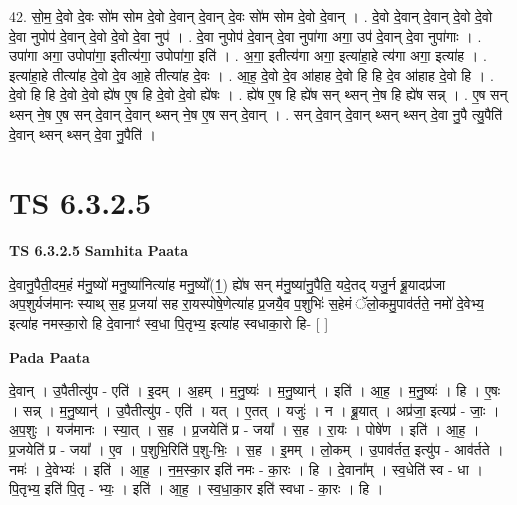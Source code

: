 \documentclass[17pt]{extarticle}
\begin{document}
42. सो॒म॒ दे॒वो दे॒वः सो॑म सोम दे॒वो दे॒वान् दे॒वान् दे॒वः सो॑म सोम दे॒वो दे॒वान् । . दे॒वो दे॒वान् दे॒वान् दे॒वो दे॒वो दे॒वा नुपोप॑ दे॒वान् दे॒वो दे॒वो दे॒वा नुप॑ । . दे॒वा नुपोप॑ दे॒वान् दे॒वा नुपा॑गा अगा॒ उप॑ दे॒वान् दे॒वा नुपा॑गाः । . उपा॑गा अगा॒ उपोपा॑गा॒ इतीत्य॑गा॒ उपोपा॑गा॒ इति॑ । . अ॒गा॒ इतीत्य॑गा अगा॒ इत्या॑हा॒हे त्य॑गा अगा॒ इत्या॑ह । . इत्या॑हा॒हे तीत्या॑ह दे॒वो दे॒व आ॒हे तीत्या॑ह दे॒वः । . आ॒ह॒ दे॒वो दे॒व आ॑हाह दे॒वो हि हि दे॒व आ॑हाह दे॒वो हि । . दे॒वो हि हि दे॒वो दे॒वो ह्ये॑ष ए॒ष हि दे॒वो दे॒वो ह्ये॑षः । . ह्ये॑ष ए॒ष हि ह्ये॑ष सन् थ्सन् ने॒ष हि ह्ये॑ष सन्न् । . ए॒ष सन् थ्सन् ने॒ष ए॒ष सन् दे॒वान् दे॒वान् थ्सन् ने॒ष ए॒ष सन् दे॒वान् । . सन् दे॒वान् दे॒वान् थ्सन् थ्सन् दे॒वा नु॒पै त्यु॒पैति॑ दे॒वान् थ्सन् थ्सन् दे॒वा नु॒पैति॑ । \newline
\pagebreak
{}

\section{ TS 6.3.2.5 }

\textbf{TS 6.3.2.5 } \newline
\textbf{Samhita Paata} \newline

दे॒वानु॒पैती॒दम॒हं म॑नु॒ष्यो॑ मनु॒ष्या॑नित्या॑ह मनु॒ष्यो᳚(1॒) ह्ये॑ष सन् म॑नु॒ष्या॑नु॒पैति॒ यदे॒तद् यजु॒र्न ब्रू॒यादप्र॑जा अप॒शुर्यज॑मानः स्याथ् स॒ह प्र॒जया॑ सह रा॒यस्पोषे॒णेत्या॑ह प्र॒जयै॒व प॒शुभिः॑ स॒हेमं ॅलो॒कमु॒पाव॑र्तते॒ नमो॑ दे॒वेभ्य॒ इत्या॑ह नमस्का॒रो हि दे॒वानाꣳ॑ स्व॒धा पि॒तृभ्य॒ इत्या॑ह स्वधाका॒रो हि- [  ] \newline

\textbf{Pada Paata} \newline

दे॒वान् । उ॒पैतीत्यु॑प - एति॑ । इ॒दम् । अ॒हम् । म॒नु॒ष्यः॑ । म॒नु॒ष्यान्॑ । इति॑ । आ॒ह॒ । म॒नु॒ष्यः॑ । हि । ए॒षः । सन्न् । म॒नु॒ष्यान्॑ । उ॒पैतीत्यु॑प - एति॑ । यत् । ए॒तत् । यजुः॑ । न । ब्रू॒यात् । अप्र॑जा॒ इत्यप्र॑ - जाः॒ । अ॒प॒शुः । यज॑मानः । स्या॒त् । स॒ह । प्र॒जयेति॑ प्र - जया᳚ । स॒ह । रा॒यः । पोषे॑ण । इति॑ । आ॒ह॒ । प्र॒जयेति॑ प्र - जया᳚ । ए॒व । प॒शुभि॒रिति॑ प॒शु-भिः॒ । स॒ह । इ॒मम् । लो॒कम् । उ॒पाव॑र्तत॒ इत्यु॑प - आव॑र्तते । नमः॑ । दे॒वेभ्यः॑ । इति॑ । आ॒ह॒ । न॒म॒स्का॒र इति॑ नमः - का॒रः । हि । दे॒वाना᳚म् । स्व॒धेति॑ स्व - धा । पि॒तृभ्य॒ इति॑ पि॒तृ - भ्यः॒ । इति॑ । आ॒ह॒ । स्व॒धा॒का॒र इति॑ स्वधा - का॒रः । हि ।  \newline
\end{document}
